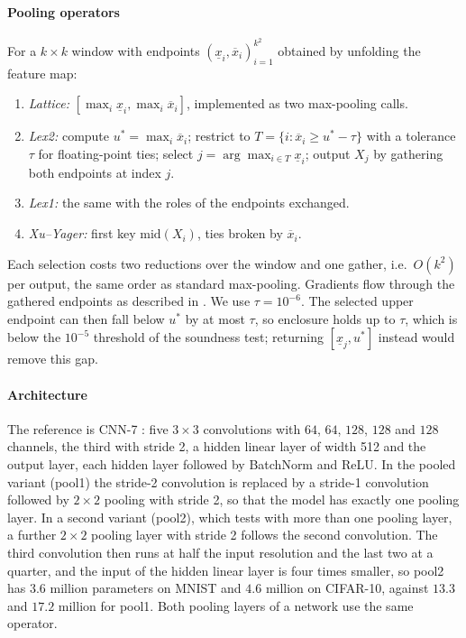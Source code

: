 \documentclass[preprint,12pt]{elsarticle}
\theoremstyle{definition}
\newcommand{\lo}[1]{\underline{#1}}
\newcommand{\up}[1]{\overline{#1}}
\begin{document}
\paragraph{Pooling operators} For a $k\times k$ window with endpoints $(\lo x_i,\up x_i)_{i=1}^{k^2}$ obtained by unfolding the feature map:
\begin{enumerate}[leftmargin=*]
\item \emph{Lattice:} $[\max_i\lo x_i,\max_i\up x_i]$, implemented as two max-pooling calls.
\item \emph{Lex2:} compute $u^*=\max_i\up x_i$; restrict to $T=\{i:\up x_i\ge u^*-\tau\}$ with a tolerance $\tau$ for floating-point ties; select $j=\arg\max_{i\in T}\lo x_i$; output $X_j$ by gathering both endpoints at index $j$.
\item \emph{Lex1:} the same with the roles of the endpoints exchanged.
\item \emph{Xu--Yager:} first key $\mathrm{mid}(X_i)$, ties broken by $\up x_i$.
\end{enumerate}
Each selection costs two reductions over the window and one gather, i.e.\ $O(k^2)$ per output, the same order as standard max-pooling. Gradients flow through the gathered endpoints as described in . We use $\tau=10^{-6}$. The selected upper endpoint can then fall below $u^*$ by at most $\tau$, so enclosure holds up to $\tau$, which is below the $10^{-5}$ threshold of the soundness test; returning $[\lo x_j,u^*]$ instead would remove this gap.

\paragraph{Architecture} The reference is CNN-7 \cite{shi2021}: five $3\times3$ convolutions with $64$, $64$, $128$, $128$ and $128$ channels, the third with stride 2, a hidden linear layer of width 512 and the output layer, each hidden layer followed by BatchNorm and ReLU. In the pooled variant (pool1) the stride-2 convolution is replaced by a stride-1 convolution followed by $2\times2$ pooling with stride 2, so that the model has exactly one pooling layer. In a second variant (pool2), which tests  with more than one pooling layer, a further $2\times2$ pooling layer with stride 2 follows the second convolution. The third convolution then runs at half the input resolution and the last two at a quarter, and the input of the hidden linear layer is four times smaller, so pool2 has $3.6$ million parameters on MNIST and $4.6$ million on CIFAR-10, against $13.3$ and $17.2$ million for pool1. Both pooling layers of a network use the same operator.
\end{document}

